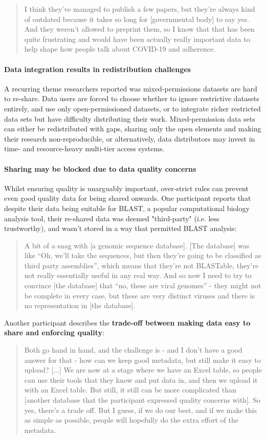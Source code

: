 \documentclass{CUP-JNL-DAP}%
\begin{document}
\blockquote{I think they've managed to publish a few papers, but they're always kind of outdated because it takes so long for [governmental body] to say yes. And they weren't allowed to preprint them, so I know that that has been quite frustrating and would have been actually really important data to help shape how people talk about COVID-19 and adherence.}

\paragraph{Data integration results in redistribution challenges}
A recurring theme researchers reported was mixed-permissions datasets are hard to re-share. Data users are forced to choose whether to ignore restrictive datasets entirely, and use only open-permissioned datasets, or to integrate richer restricted data sets but have difficulty distributing their work. Mixed-permission data sets can either be redistributed with gaps, sharing only the open elements and making their research non-reproducible, or alternatively, data distributors may invest in time- and resource-heavy multi-tier access systems. 

\paragraph{Sharing may be blocked due to data quality concerns}
Whilst ensuring quality is unarguably important, over-strict rules can prevent even good quality data for being shared onwards.  One participant reports that despite their data being suitable for BLAST, a popular computational biology analysis tool, their re-shared data was deemed "third-party" (i.e. less trustworthy), and wasn't stored in a way that permitted BLAST analysis: 

\blockquote{A bit of a snag with [a genomic sequence database]. [The database] was like \enquote{Oh, we'll take the sequences, but then they're going to be classified as third party assemblies}, which means that they're not BLASTable, they're not really essentially useful in any real way. And so now I need to try to convince [the database] that \enquote{no, these are viral genomes} - they might not be complete in every case, but these are very distinct viruses and there is no representation in [the database].}

Another participant describes the \textbf{trade-off between making data easy to share and enforcing quality}: 
\blockquote{Both go hand in hand, and the challenge is - and I don't have a good answer for that - how can we keep good metadata, but still make it easy to upload? [...]  We are now at a stage where we have an Excel table, so people can use their tools that they know and put data in, and then we upload it with an Excel table. But still, it still can be more complicated than [another database that the participant expressed quality concerns with]. So yes, there's a trade off. But I guess, if we do our best, and if we make this as simple as possible, people will hopefully do the extra effort of the metadata.}
\end{document}
